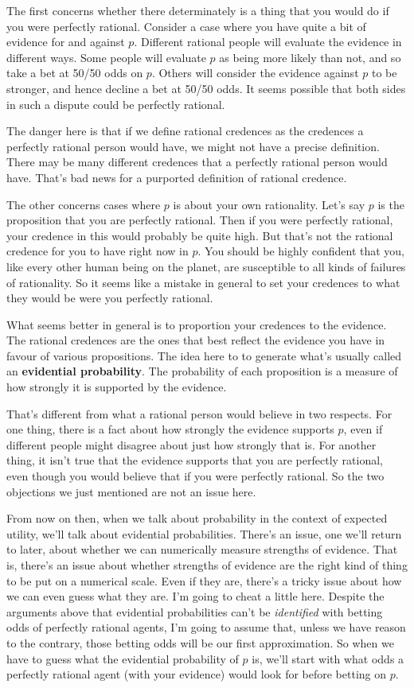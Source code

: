 The first concerns whether there determinately is a thing that you would do if you were perfectly rational. Consider a case where you have quite a bit of evidence for and against $p$. Different rational people will evaluate the evidence in different ways. Some people will evaluate $p$ as being more likely than not, and so take a bet at 50/50 odds on $p$. Others will consider the evidence against $p$ to be stronger, and hence decline a bet at 50/50 odds. It seems possible that both sides in such a dispute could be perfectly rational.

The danger here is that if we define rational credences as the credences a perfectly rational person would have, we might not have a precise definition. There may be many different credences that a perfectly rational person would have. That's bad news for a purported definition of rational credence.

The other concerns cases where $p$ is about your own rationality. Let's say $p$ is the proposition that you are perfectly rational. Then if you were perfectly rational, your credence in this would probably be quite high. But that's not the rational credence for you to have right now in $p$. You should be highly confident that you, like every other human being on the planet, are susceptible to all kinds of failures of rationality. So it seems like a mistake in general to set your credences to what they would be were you perfectly rational.

What seems better in general is to proportion your credences to the evidence. The rational credences are the ones that best reflect the evidence you have in favour of various propositions. The idea here to to generate what's usually called an \textbf{evidential probability}. The probability of each proposition is a measure of how strongly it is supported by the evidence.

That's different from what a rational person would believe in two respects. For one thing, there is a fact about how strongly the evidence supports $p$, even if different people might disagree about just how strongly that is. For another thing, it isn't true that the evidence supports that you are perfectly rational, even though you would believe that if you were perfectly rational. So the two objections we just mentioned are not an issue here.

From now on then, when we talk about probability in the context of expected utility, we'll talk about evidential probabilities. There's an issue, one we'll return to later, about whether we can numerically measure strengths of evidence. That is, there's an issue about whether strengths of evidence are the right kind of thing to be put on a numerical scale. Even if they are, there's a tricky issue about how we can even guess what they are. I'm going to cheat a little here. Despite the arguments above that evidential probabilities can't be \textit{identified} with betting odds of perfectly rational agents, I'm going to assume that, unless we have reason to the contrary, those betting odds will be our first approximation. So when we have to guess what the evidential probability of $p$ is, we'll start with what odds a perfectly rational agent (with your evidence) would look for before betting on $p$.

